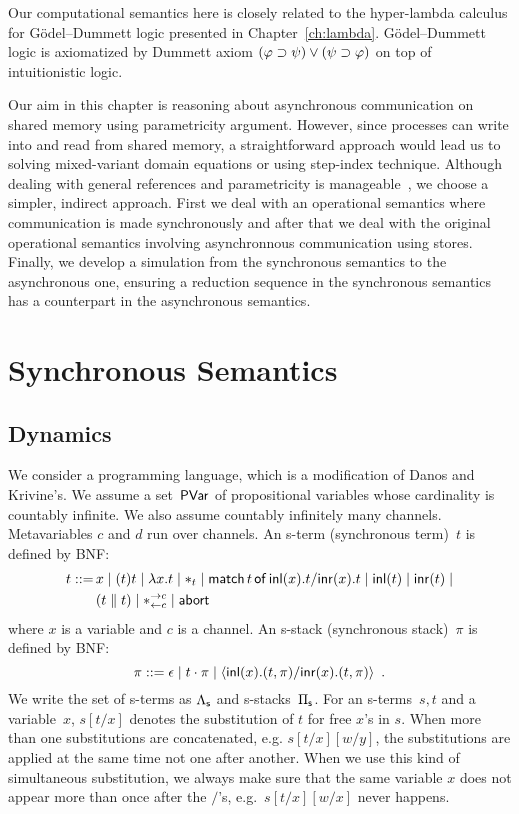 Our computational semantics here is closely related to
the hyper-lambda calculus for G\"odel--Dummett logic presented in
Chapter~\ref{ch:lambda}.
G\"odel--Dummett logic is axiomatized by Dummett axiom $(\varphi\supset\psi)\lor(\psi\supset\varphi)$
on top of intuitionistic logic.  

Our aim in this chapter is reasoning about asynchronous communication on
shared memory using parametricity argument.
However, since processes can write into and read from shared memory,
a straightforward approach would lead us to solving mixed-variant domain
equations or using step-index technique.
Although dealing with general references and parametricity
is manageable~\citep{birkedal2009relational},
we choose a simpler, indirect approach.
First we deal with an operational semantics where communication is made
synchronously and after that we deal with the original operational
semantics involving asynchronnous communication using stores.
Finally, we develop a simulation from the synchronous semantics to the
asynchronous one, ensuring a reduction sequence in the synchronous
semantics has a counterpart in the asynchronous semantics.

\section{Synchronous Semantics}
\label{sec:sync}

\subsection{Dynamics}
We consider a programming language, which is a modification of
Danos and Krivine's.
We assume a set~$\mathsf{PVar}$ of propositional variables whose cardinality is
countably infinite.
We also assume countably infinitely many channels.
Metavariables $c$ and $d$ run over channels.
An s-term (synchronous term)~$t$ is defined by BNF:
\begin{align*}
 t::= \,&x
 \mid (t)t
 \mid \lambda x.t
 \mid \ast_t
 \mid \mathsf{match}\,{t}\,\mathsf{of}\, \mathsf{inl}({x}). {t}/ \mathsf{inr}({x}). {t}
 \mid \mathsf{inl}({t})
 \mid \mathsf{inr}({t})
 \mid \\ &
 (t\parallel t)
 \mid \ast^{\rightarrow {c}}_{\leftarrow{c}}
 \mid \mathsf{abort\,}
\end{align*}
where $x$ is a variable and $c$ is a channel.
An s-stack (synchronous stack)~$\pi$ is defined by BNF:
\[
 \pi ::= \epsilon
 \mid t\cdot \pi
 \mid \langle \mathsf{inl}({x}). ({t},{\pi})/ \mathsf{inr}({x}). ({t},{\pi})\rangle
 \enspace.
\]
We write the set of s-terms as $\Lambda_{\mathsf s}$ and s-stacks~$\Pi_{\mathsf s}$.
For an s-terms~$s,t$ and a variable~$x$, $s[t/x]$ denotes the
substitution of $t$ for free $x$'s in $s$.  When more than one
substitutions are concatenated, e.g. $s[t/x][w/y]$, the substitutions
are applied at the same time not one after another.  When we use this
kind of simultaneous substitution, we always make sure that the same
variable $x$ does not appear more than once after the $/$'s,
e.g.~$s[t/x][w/x]$ never happens.


